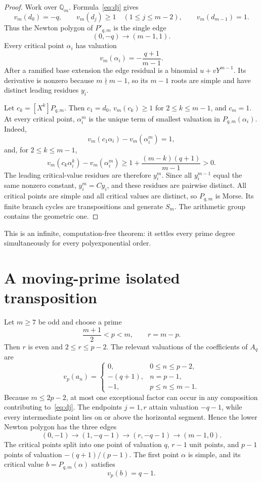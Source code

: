 \documentclass[11pt]{article}
\theoremstyle{keio}
\theoremstyle{definition}
\theoremstyle{remark}
\newcommand{\Q}{\mathbb Q}
\begin{document}
\begin{proof}
Work over $\Q_m$. Formula~\eqref{eq:dj} gives
\[
v_m(d_0)=-q,
\qquad
v_m(d_j)\ge1\quad(1\le j\le m-2),
\qquad
v_m(d_{m-1})=1.
\]
Thus the Newton polygon of $P'_{q,m}$ is the single edge
\[
(0,-q)\longrightarrow(m-1,1).
\]
Every critical point $\alpha_i$ has valuation
\[
v_m(\alpha_i)=-\frac{q+1}{m-1}.
\]
After a ramified base extension the edge residual is a binomial
$u+vY^{m-1}$. Its derivative is nonzero because $m\nmid m-1$, so its
$m-1$ roots are simple and have distinct leading residues $y_i$.

Let $c_k=[X^k]P_{q,m}$. Then $c_1=d_0$, $v_m(c_k)\ge1$ for
$2\le k\le m-1$, and $c_m=1$. At every critical point,
$\alpha_i^m$ is the unique term of smallest valuation in
$P_{q,m}(\alpha_i)$. Indeed,
\[
v_m(c_1\alpha_i)-v_m(\alpha_i^m)=1,
\]
and, for $2\le k\le m-1$,
\[
v_m(c_k\alpha_i^k)-v_m(\alpha_i^m)
\ge1+\frac{(m-k)(q+1)}{m-1}>0.
\]
The leading critical-value residues are therefore $y_i^m$. Since all
$y_i^{m-1}$ equal the same nonzero constant, $y_i^m=Cy_i$, and these
residues are pairwise distinct. All critical points are simple and all
critical values are distinct, so $P_{q,m}$ is Morse. Its finite branch
cycles are transpositions and generate $S_m$. The arithmetic group contains
the geometric one.
\end{proof}

This is an infinite, computation-free theorem: it settles every prime
degree simultaneously for every polyexponential order.

\section{A moving-prime isolated transposition}

Let $m\ge7$ be odd and choose a prime
\begin{equation}
\frac{m+1}{2}<p<m,
\qquad
r=m-p.
\label{eq:window}
\end{equation}
Then $r$ is even and $2\le r\le p-2$. The relevant valuations of the
coefficients of $A_q$ are
\[
v_p(a_n)=
\begin{cases}
0,&0\le n\le p-2,\\
-(q+1),&n=p-1,\\
-1,&p\le n\le m-1.
\end{cases}
\]
Because $m\le2p-2$, at most one exceptional factor can occur in any
composition contributing to~\eqref{eq:dj}.  The endpoints $j=1,r$ attain
valuation $-q-1$, while every intermediate point lies on or above the
horizontal segment.  Hence the lower Newton polygon has the three edges
\begin{equation}
(0,-1)\longrightarrow(1,-q-1)
\longrightarrow(r,-q-1)\longrightarrow(m-1,0).
\label{eq:threeedge}
\end{equation}
The critical points split into one point of valuation $q$, $r-1$ unit
points, and $p-1$ points of valuation $-(q+1)/(p-1)$. The first point
$\alpha$ is simple, and its critical value $b=P_{q,m}(\alpha)$ satisfies
\begin{equation}
\boxed{v_p(b)=q-1.}
\label{eq:bval}
\end{equation}
\end{document}
